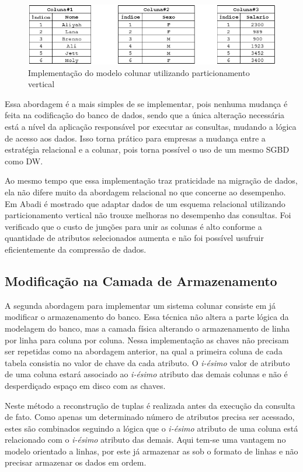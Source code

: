 \begin{figure}[htpb]
	\centering
        \includegraphics[width=\textwidth]{vertical}
	\caption{Implementação do modelo colunar utilizando particionamento vertical}
	\label{fig:vertical}
\end{figure}

Essa abordagem é a mais simples de se implementar, pois nenhuma mudança é feita 
na codificação do banco de dados, sendo que a única alteração necessária está a nível 
da aplicação responsável por executar as consultas, mudando a lógica de acesso aos dados. Isso torna prático para empresas a 
mudança entre a estratégia relacional e a colunar, pois torna possível o uso de um mesmo 
SGBD como DW.

Ao mesmo tempo que essa implementação traz praticidade na migração de dados, ela não difere 
muito da abordagem relacional no que concerne ao desempenho. Em Abadi \cite{abadi2008query} 
é mostrado que adaptar dados de um esquema relacional utilizando particionamento vertical não 
trouxe melhoras no desempenho das consultas. Foi verificado que o custo de junções para unir 
as colunas é alto conforme a quantidade de atributos selecionados aumenta e não foi possível 
usufruir eficientemente da compressão de dados.

\subsection{Modificação na Camada de Armazenamento}

A segunda abordagem para implementar um sistema colunar consiste em já modificar o armazenamento do banco. Essa técnica não altera a parte 
lógica da modelagem do banco, mas a camada física alterando o armazenamento de 
linha por linha para coluna por coluna. Nessa implementação as chaves não precisam ser 
repetidas como na abordagem anterior, na qual a primeira coluna de cada tabela 
consistia no valor de chave da cada atributo. O \textit{i-ésimo} valor de atributo 
de uma coluna estará associado ao \textit{i-ésimo} atributo das demais colunas e 
não é desperdiçado espaço em disco com as chaves.

Neste método a reconstrução de tuplas é realizada antes da execução da consulta de fato. Como apenas um determinado número de atributos precisa ser acessado, estes são combinados seguindo a lógica que o \textit{i-ésimo} atributo de uma coluna está relacionado com o \textit{i-ésimo} atributo das demais. Aqui tem-se uma vantagem no modelo orientado a linhas, por este já armazenar as sob o formato de linhas e não precisar armazenar os dados em ordem.

